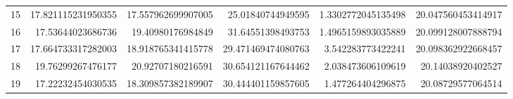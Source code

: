 \begin{tabular}{lrrrrr}
15 & 17.821115231950355 & 17.557962699907005 & 25.01840744949595 & 1.3302772045135498 & 20.047560453414917 \\
16 & 17.53644023686736 & 19.40980176984849 & 31.64551398493753 & 1.4965159893035889 & 20.099128007888794 \\
17 & 17.664733317282003 & 18.918765341415778 & 29.471469474080763 & 3.542283773422241 & 20.098362922668457 \\
18 & 19.76299267476177 & 20.92707180216591 & 30.654121167644462 & 2.038473606109619 & 20.14038920402527 \\
19 & 17.22232454030535 & 18.309857382189907 & 30.444401159857605 & 1.477264404296875 & 20.08729577064514 \\
\hline
\end{tabular}
